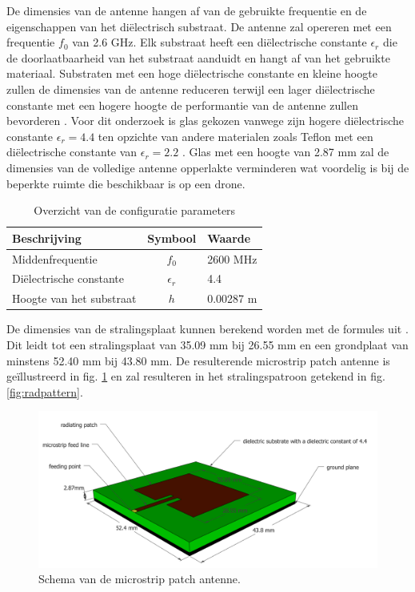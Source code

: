 \documentclass[twocolumn]{phdsymp_dutch}
\begin{document}
De dimensies van de antenne hangen af van de gebruikte frequentie en de eigenschappen van het di\"electrisch substraat.
De antenne zal opereren met een frequentie $f_0$ van 2.6 GHz. 
Elk substraat heeft een di\"electrische constante $\epsilon_r$ die de doorlaatbaarheid 
van het substraat aanduidt en hangt af van het gebruikte materiaal.
Substraten met een hoge di\"electrische constante en kleine hoogte zullen de dimensies van de antenne reduceren 
terwijl  een lager di\"electrische constante met een hogere hoogte de performantie van de 
antenne zullen bevorderen \cite{J14_antennadesign,J15_antennadesign}. 
Voor dit onderzoek is glas gekozen vanwege zijn hogere di\"electrische constante
 $\epsilon_r = 4.4$ ten opzichte van andere materialen zoals Teflon met een di\"electrische constante
van $\epsilon_r = 2.2$ \cite{J14_antennadesign}. 
Glas met een hoogte van 2.87 mm 
zal de dimensies van de volledige antenne opperlakte verminderen wat 
voordelig is bij de beperkte ruimte die beschikbaar is op een drone.

\begin{table}[h!]
\centering
\begin{tabular}{|l|c|l|}
\hline
 Beschrijving            & Symbool          & Waarde         \\    \hline
 Middenfrequentie      & $f_0$           & 2600 MHz       \\ 
 Di\"electrische constante    & $\epsilon_r$    & 4.4         \\ 
 Hoogte van het substraat & $h$             & 0.00287 m    \\ \hline
\end{tabular}
\caption{Overzicht van de configuratie parameters}
\label{table:antennaparas}
\end{table}

De dimensies van de stralingsplaat kunnen berekend worden met de formules uit \cite{J14_antennadesign,J15_antennadesign}.
Dit leidt tot een stralingsplaat van 35.09 mm bij 26.55 mm en  een grondplaat van minstens 52.40 mm bij 43.80 mm.
De resulterende microstrip patch antenne is ge\"illustreerd in fig. \ref{fig:basicpatchantenna} en zal resulteren 
in het stralingspatroon getekend in fig. \ref{fig:radpattern}.
\vspace{ 6.4 mm}
\begin{figure}[h!]
\centering
  \includegraphics[width=\linewidth]{MicrostripAntenna.png}
  \caption{Schema van de microstrip patch antenne.}
  \label{fig:basicpatchantenna}
\end{figure}
\end{document}
